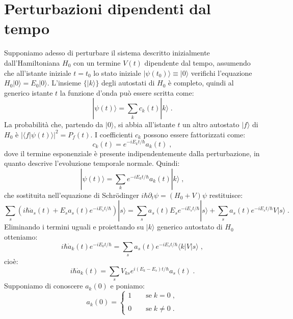 \documentclass[10pt,a4paper]{report}
\theoremstyle{definition}
\numberwithin{equation}{section}
\newcommand{\bra}{\langle}
\newcommand{\ket}{\rangle}
\newcommand{\Sch}{Schrödinger}
\begin{document}
\section{Perturbazioni dipendenti dal tempo}
Supponiamo adesso di perturbare il sistema descritto inizialmente dall'Hamiltoniana $H_0$ con un termine $V(t)$ dipendente dal tempo, assumendo che all'istante iniziale $t=t_0$ lo stato iniziale $|\psi(t_0)\ket\equiv |0\ket$ verifichi l'equazione $H_0|0\ket=E_0|0\ket$. L'insieme $\{|k\ket\}$ degli autostati di $H_0$ è completo, quindi al generico istante $t$ la funzione d'onda può essere scritta come:
\begin{equation}
|\psi(t)\ket=\sum_k c_k(t)|k\ket\;.
\end{equation}
La probabilità che, partendo da $|0\ket$, si abbia all'istante $t$ un altro autostato $|f\ket$ di $H_0$ è $|\bra f|\psi(t)\ket|^2=P_f(t)$. I coefficienti $c_k$ possono essere fattorizzati come:
\begin{equation}
c_k(t)=e^{-iE_kt/\hbar}a_k(t)\;,
\end{equation}
dove il termine esponenziale è presente indipendentemente dalla perturbazione, in quanto descrive l'evoluzione temporale normale. Quindi:
\begin{equation}
|\psi(t)\ket=\sum_k e^{-iE_kt/\hbar}a_k(t)|k\ket\;,
\end{equation}
che sostituita nell'equazione di \Sch\; $i\hbar\partial_t\psi=(H_0+V)\psi$ restituisce:
\begin{equation}
\sum_s(i\hbar\dot{a}_s(t)+E_sa_s(t)e^{-iE_st/\hbar})|s\ket=\sum_s a_s(t)E_se^{-iE_st/\hbar}|s\ket+\sum_sa_s(t)e^{-iE_st/\hbar}V|s\ket\;.
\end{equation}
Eliminando i termini uguali e proiettando su $|k\ket$ generico autostato di $H_0$ otteniamo:
\begin{equation*}
i\hbar\dot{a}_k(t)e^{-iE_kt/\hbar}=\sum_s a_s(t)e^{-iE_st/\hbar}\bra k|V|s\ket\;,
\end{equation*}
cioè:
\begin{equation}
i\hbar \dot{a}_k(t)=\sum_s V_{ks}e^{i(E_k-E_s)t/\hbar}a_s(t)\;.
\end{equation}
Supponiamo di conoscere $a_k(0)$ e poniamo:
\begin{equation}
a_k(0)=\begin{cases}
1\qquad \mbox{se}\;k=0\;, \\
\\
0\qquad \mbox{se}\;k\ne 0\;.
\end{cases}
\end{equation}
\end{document}
